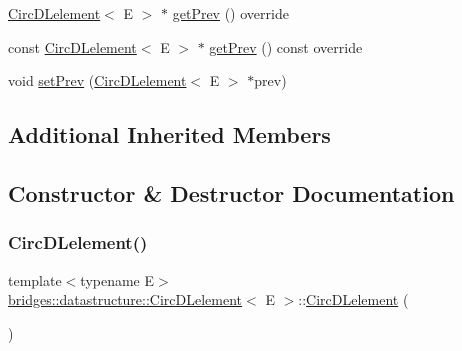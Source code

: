\begin{DoxyCompactItemize}
\item 
\hyperlink{classbridges_1_1datastructure_1_1_circ_d_lelement}{Circ\+D\+Lelement}$<$ E $>$ $\ast$ \hyperlink{classbridges_1_1datastructure_1_1_circ_d_lelement_a5218bb590a588e1d1aaa8f53403ed0cb}{get\+Prev} () override
\item 
const \hyperlink{classbridges_1_1datastructure_1_1_circ_d_lelement}{Circ\+D\+Lelement}$<$ E $>$ $\ast$ \hyperlink{classbridges_1_1datastructure_1_1_circ_d_lelement_a80a08e1d066b1a1f474aa9fd3bc29972}{get\+Prev} () const override
\item 
void \hyperlink{classbridges_1_1datastructure_1_1_circ_d_lelement_ac47b0221a0eebc3c539eec1700f2c776}{set\+Prev} (\hyperlink{classbridges_1_1datastructure_1_1_circ_d_lelement}{Circ\+D\+Lelement}$<$ E $>$ $\ast$prev)
\end{DoxyCompactItemize}
\subsection*{Additional Inherited Members}


\subsection{Constructor \& Destructor Documentation}
\mbox{\label{classbridges_1_1datastructure_1_1_circ_d_lelement_acd151aff05440f2c6fe26f41b46e0668}} 
\subsubsection{\texorpdfstring{Circ\+D\+Lelement()}{CircDLelement()}\hspace{0.1cm}{\footnotesize\ttfamily [1/4]}}
{\footnotesize\ttfamily template$<$typename E$>$ \\
\hyperlink{classbridges_1_1datastructure_1_1_circ_d_lelement}{bridges\+::datastructure\+::\+Circ\+D\+Lelement}$<$ E $>$\+::\hyperlink{classbridges_1_1datastructure_1_1_circ_d_lelement}{Circ\+D\+Lelement} (\begin{DoxyParamCaption}{ }\end{DoxyParamCaption})\hspace{0.3cm}{\ttfamily [inline]}}

